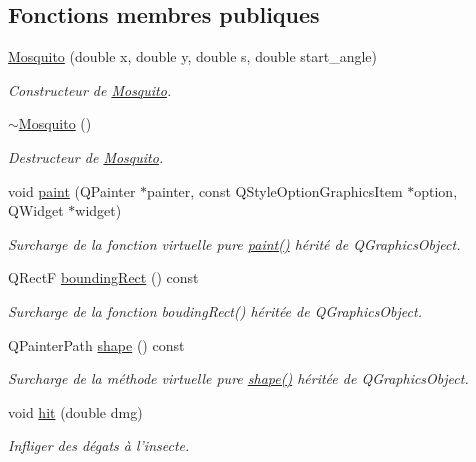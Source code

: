 \subsection*{Fonctions membres publiques}
\begin{DoxyCompactItemize}
\item 
\hyperlink{classMosquito_ad7755ed5b7cd5ed184c5cfb2d4f0785d}{Mosquito} (double x, double y, double s, double start\_\-angle)
\begin{DoxyCompactList}\small\item\em Constructeur de \hyperlink{classMosquito}{Mosquito}. \end{DoxyCompactList}\item 
\hyperlink{classMosquito_aec4169f2175c544c8d6e119164b469cd}{$\sim$Mosquito} ()
\begin{DoxyCompactList}\small\item\em Destructeur de \hyperlink{classMosquito}{Mosquito}. \end{DoxyCompactList}\item 
void \hyperlink{classMosquito_a306ab9aefce1f42ae5d46746a018c845}{paint} (QPainter $\ast$painter, const QStyleOptionGraphicsItem $\ast$option, QWidget $\ast$widget)
\begin{DoxyCompactList}\small\item\em Surcharge de la fonction virtuelle pure \hyperlink{classMosquito_a306ab9aefce1f42ae5d46746a018c845}{paint()} hérité de QGraphicsObject. \end{DoxyCompactList}\item 
QRectF \hyperlink{classBug_a9b39c25361faad07b1bf2dd927d09dab}{boundingRect} () const 
\begin{DoxyCompactList}\small\item\em Surcharge de la fonction boudingRect() héritée de QGraphicsObject. \end{DoxyCompactList}\item 
QPainterPath \hyperlink{classBug_a587a36d3145c2b4dba6c689af22c65ac}{shape} () const 
\begin{DoxyCompactList}\small\item\em Surcharge de la méthode virtuelle pure \hyperlink{classBug_a587a36d3145c2b4dba6c689af22c65ac}{shape()} héritée de QGraphicsObject. \end{DoxyCompactList}\item 
void \hyperlink{classBug_a63402c05b5ba3fb034e41f1ced0e4b9f}{hit} (double dmg)
\begin{DoxyCompactList}\small\item\em Infliger des dégats à l'insecte. \end{DoxyCompactList}\item 

\end{DoxyCompactItemize}
